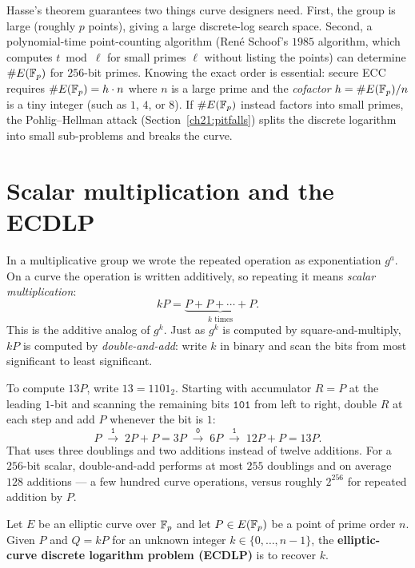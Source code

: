 \begin{whybox}
Hasse's theorem guarantees two things curve designers need. First, the group is large
(roughly $p$ points), giving a large discrete-log search space. Second, a polynomial-time
point-counting algorithm (Ren\'e Schoof's $1985$ algorithm, which computes $t \bmod \ell$
for small primes $\ell$ without listing the points) can determine $\#E(\mathbb{F}_p)$ for
$256$-bit primes. Knowing the exact order is essential: secure ECC requires $\#E(\mathbb{F}_p) =
h \cdot n$ where $n$ is a large prime and the \emph{cofactor} $h = \#E(\mathbb{F}_p)/n$ is a tiny
integer (such as $1$, $4$, or $8$). If $\#E(\mathbb{F}_p)$ instead factors into small primes, the
Pohlig--Hellman attack (Section~\ref{ch21:pitfalls}) splits the discrete logarithm into
small sub-problems and breaks the curve.
\end{whybox}

\section{Scalar multiplication and the ECDLP}
\label{ch21:ecdlp}

In a multiplicative group we wrote the repeated operation as exponentiation $g^a$. On a
curve the operation is written additively, so repeating it means \emph{scalar
multiplication}:
\[
kP = \underbrace{P + P + \cdots + P}_{k \text{ times}}.
\]
This is the additive analog of $g^k$. Just as $g^k$ is computed by square-and-multiply,
$kP$ is computed by \emph{double-and-add}: write $k$ in binary and scan the bits from
most significant to least significant.

\begin{example}
\label{ch21:dbladd}
To compute $13P$, write $13 = 1101_2$. Starting with accumulator $R = P$ at the leading
$1$-bit and scanning the remaining bits $\mathtt{101}$ from left to right, double $R$ at
each step and add $P$ whenever the bit is $1$:
\[
P \;\xrightarrow{\,\mathtt{1}\,}\; 2P + P = 3P
  \;\xrightarrow{\,\mathtt{0}\,}\; 6P
  \;\xrightarrow{\,\mathtt{1}\,}\; 12P + P = 13P.
\]
That uses three doublings and two additions instead of twelve additions. For a $256$-bit
scalar, double-and-add performs at most $255$ doublings and on average $128$ additions ---
a few hundred curve operations, versus roughly $2^{256}$ for repeated addition by $P$.
\end{example}

\begin{definition}
\label{ch21:ecdlp-def}
Let $E$ be an elliptic curve over $\mathbb{F}_p$ and let $P \in E(\mathbb{F}_p)$ be a point of prime
order $n$. Given $P$ and $Q = kP$ for an unknown integer $k \in \{0,\dots,n-1\}$, the
\textbf{elliptic-curve discrete logarithm problem (ECDLP)} is to recover $k$.
\end{definition}

